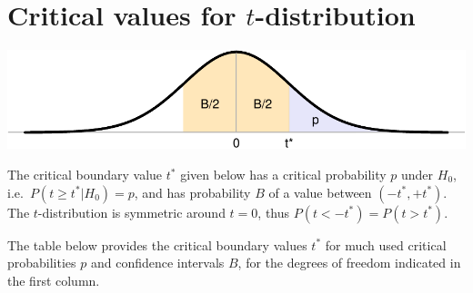 \documentclass[
]{book}
\begin{document}
\hypertarget{app-criticaltvalues}{%
\chapter{\texorpdfstring{Critical values for \(t\)-distribution}{Critical values for t-distribution}}\label{app-criticaltvalues}}

\includegraphics{QMS-EN_files/figure-latex/criticaltvalues-auxiliaryfigure-1.pdf}

The critical boundary value \(t^*\) given below has a critical probability \(p\)
under \(H_0\), i.e.~\(P(t \geq t^*|H_0)=p\), and has probability \(B\) of a
value between \((-t^*, +t^*)\). The \(t\)-distribution is symmetric around
\(t=0\), thus \(P(t < -t^*) = P(t > t^*)\).

The table below provides the critical boundary values \(t^*\) for much used critical probabilities \(p\) and
confidence intervals \(B\), for the degrees of freedom indicated in the first column.
\end{document}
